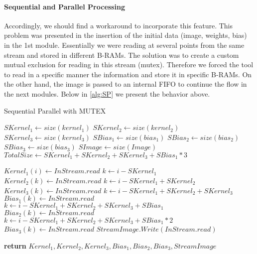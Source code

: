 \paragraph{Sequential and Parallel Processing}

Accordingly, we should find a workaround to incorporate this feature. This problem was presented in the insertion of the initial data (image, weights, bias) in the 1st module. Essentially we were reading at several points from the same stream and stored in different B-RAMs. The solution was to create a custom mutual exclusion for reading in this stream (mutex). Therefore we forced the tool to read in a specific manner the information and store it in specific B-RAMs. On the other hand, the image is passed to an internal FIFO to continue the flow in the next modules.
Below in \ref{alg:SP} we present the behavior above.

\begin{algorithm}[h]
\caption{Sequential Parallel with MUTEX}\label{alg:SP}
\begin{algorithmic}[1]
\State $SKernel_{1} \gets size(kernel_{1})$ 
\State $SKernel_{2} \gets size(kernel_{2})$ 
\State $SKernel_{3} \gets size(kernel_{3})$ 
\State $SBias_{1} \gets size(bias_{1})$ 
\State $SBias_{2} \gets size(bias_{2})$ 
\State $SBias_{3} \gets size(bias_{3})$ 
\State $SImage \gets size(Image)$ 
\State $TotalSize \gets SKernel_{1}+SKernel_{2}+SKernel_{3}+SBias_{1}*3$ 

\State $Kernel_{1}(i) \gets InStream.read$ 
\State $k\gets i-SKernel_{1}$ 
\State $Kernel_{2}(k) \gets InStream.read$ 
\State $k\gets i-SKernel_{1}+SKernel_{2}$ 
\State $Kernel_{3}(k) \gets InStream.read$ 
\State $k\gets i-SKernel_{1}+SKernel_{2}+SKernel_{3}$ 
\State $Bias_{1}(k) \gets InStream.read$ 
\State $k\gets i-SKernel_{1}+SKernel_{2}+SKernel_{3}+SBias_{1}$ 
\State $Bias_{2}(k) \gets InStream.read$ 
\State $k\gets i-SKernel_{1}+SKernel_{2}+SKernel_{3}+SBias_{1}*2$ 
\State $Bias_{3}(k) \gets InStream.read$ 
\State $StreamImage.Write(InStream.read)$ 
\EndIf
\EndFor 

\State \textbf{return} $Kernel_{1},Kernel_{2},Kernel_{3},Bias_{1},Bias_{2},Bias_{3},StreamImage$       
\EndProcedure
\end{algorithmic}
\end{algorithm}


